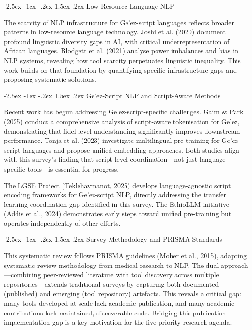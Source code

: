 \documentclass[12pt,a4paper]{article}
\makeatletter
\theoremstyle{plain}
\theoremstyle{definition}
\renewcommand{\subsection}{\@startsection{subsection}{2}{\z@}%
  {-2.5ex \@plus -1ex \@minus -.2ex}%
  {1.5ex \@plus .2ex}%
  {\normalsize\bfseries\color{DarkGray}}}
\makeatother
\begin{document}
\subsection{Low-Resource Language NLP}

The scarcity of NLP infrastructure for Ge'ez-script languages reflects broader patterns in low-resource language technology. Joshi et al. (2020) document profound linguistic diversity gaps in AI, with critical underrepresentation of African languages. Blodgett et al. (2021) analyse power imbalances and bias in NLP systems, revealing how tool scarcity perpetuates linguistic inequality. This work builds on that foundation by quantifying specific infrastructure gaps and proposing systematic solutions.

\subsection{Ge'ez-Script NLP and Script-Aware Methods}

Recent work has begun addressing Ge'ez-script-specific challenges. Gaim \& Park (2025) conduct a comprehensive analysis of script-aware tokenisation for Ge'ez, demonstrating that fidel-level understanding significantly improves downstream performance. Tonja et al. (2023) investigate multilingual pre-training for Ge'ez-script languages and propose unified embedding approaches. Both studies align with this survey's finding that script-level coordination---not just language-specific tools---is essential for progress.

The LGSE Project (Teklehaymanot, 2025) develops language-agnostic script encoding frameworks for Ge'ez-script NLP, directly addressing the transfer learning coordination gap identified in this survey. The EthioLLM initiative (Addis et al., 2024) demonstrates early steps toward unified pre-training but operates independently of other efforts.

\subsection{Survey Methodology and PRISMA Standards}

This systematic review follows PRISMA guidelines (Moher et al., 2015), adapting systematic review methodology from medical research to NLP. The dual approach---combining peer-reviewed literature with tool discovery across multiple repositories---extends traditional surveys by capturing both documented (published) and emerging (tool repository) artefacts. This reveals a critical gap: many tools developed at scale lack academic publication, and many academic contributions lack maintained, discoverable code. Bridging this publication-implementation gap is a key motivation for the five-priority research agenda.
\end{document}

